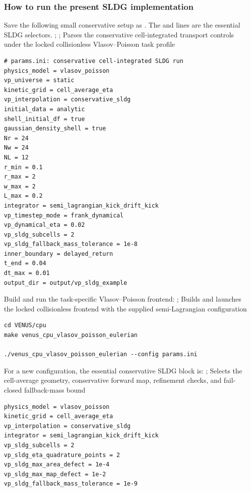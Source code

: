 \subsubsection{How to run the present SLDG implementation}

Save the following small conservative setup as .  The
 and  lines are the essential SLDG
selectors.
{;
 ; }
{Parses the conservative cell-integrated transport controls under the locked
 collisionless Vlasov--Poisson task profile}
\begin{lstlisting}[basicstyle=\ttfamily\scriptsize]
# params.ini: conservative cell-integrated SLDG run
physics_model = vlasov_poisson
vp_universe = static
kinetic_grid = cell_average_eta
vp_interpolation = conservative_sldg
initial_data = analytic
shell_initial_df = true
gaussian_density_shell = true
Nr = 24
Nw = 24
NL = 12
r_min = 0.1
r_max = 2
w_max = 2
L_max = 0.2
integrator = semi_lagrangian_kick_drift_kick
vp_timestep_mode = frank_dynamical
vp_dynamical_eta = 0.02
vp_sldg_subcells = 2
vp_sldg_fallback_mass_tolerance = 1e-8
inner_boundary = delayed_return
t_end = 0.04
dt_max = 0.01
output_dir = output/vp_sldg_example
\end{lstlisting}
Build and run the task-specific Vlasov--Poisson frontend:
{; }
{Builds and launches the locked collisionless frontend with the supplied
 semi-Lagrangian configuration}
\begin{lstlisting}
cd VENUS/cpu
make venus_cpu_vlasov_poisson_eulerian

./venus_cpu_vlasov_poisson_eulerian --config params.ini
\end{lstlisting}
For a new configuration, the essential conservative SLDG block is:
{;
 }
{Selects the cell-average geometry, conservative forward map, refinement
 checks, and fail-closed fallback-mass bound}
\begin{lstlisting}
physics_model = vlasov_poisson
kinetic_grid = cell_average_eta
vp_interpolation = conservative_sldg
integrator = semi_lagrangian_kick_drift_kick
vp_sldg_subcells = 2
vp_sldg_eta_quadrature_points = 2
vp_sldg_max_area_defect = 1e-4
vp_sldg_max_map_defect = 1e-2
vp_sldg_fallback_mass_tolerance = 1e-9
\end{lstlisting}
